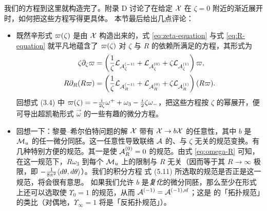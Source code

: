 我们的方程到这里就构造完了。附录 D 讨论了在给定 $\mathcal{X}$ 在 $\zeta = 0$ 附近的渐近展开时，如何把这些方程写得更具体。%
本节最后给出几点评论：

\begin{itemize}
\item
既然辛形式 $\varpi(\zeta)$ 是由 $\mathcal{X}$ 构造出来的，式 \eqref{eq:zeta-equation} 与式 \eqref{eq:R-equation} 就平凡地蕴含了 $\varpi(\zeta)$ 对 $\zeta$ 与 $R$ 的依赖所满足的方程，其形式为
\begin{align}
\zeta \partial_\zeta \varpi &= \left( \frac{1}{\zeta} \mathcal{L}_{\mathcal{A}_\zeta^{(-1)}} +
\mathcal{L}_{\mathcal{A}_\zeta^{(0)}} + \zeta \mathcal{L}_{\mathcal{A}_\zeta^{(1)}} \right)  \varpi,
\\ R \partial_R (R\varpi) &= \left( \frac{1}{\zeta} \mathcal{L}_{\mathcal{A}_R^{(-1)}} +
\mathcal{L}_{\mathcal{A}_R^{(0)}} + \zeta \mathcal{L}_{\mathcal{A}_R^{(1)}} \right) (R \varpi). \label{eq:omega-R}
\end{align}
回想式 (3.4) 中 $\varpi(\zeta) = - \frac{i}{2 \zeta}\omega^+ + \omega_3 - \frac{i}{2} \zeta \omega_-$，把这些方程按 $\zeta$ 的幂展开，便可导出超凯勒形式 $\vec\omega$ 的一些有趣的微分方程。%

\item
回想一下：黎曼--希尔伯特问题的解 $\mathcal{X}$ 带有 $\mathcal{X} \to b \mathcal{X}$ 的任意性，其中 $b$ 是 $\mathcal{M}_u$ 的任一微分同胚。这一任意性导致联络 $\mathcal{A}$ 的、与 $\zeta$ 无关的规范变换。有几种特别方便的规范。其一是使 $\mathcal{A}_R^{(0)} = 0$ 的规范。由式 \eqref{eq:omega-R} 可知，在这一规范下，$R \omega_3$ 到每个 $\mathcal{M}_u$ 上的限制与 $R$ 无关（因而等于其 $R \to \infty$ 极限，即 $- \frac{1}{8 \pi^2} \langle d\theta, d\theta \rangle$）。我们的积分方程 式 (5.11) 所选取的规范是否正是这一规范，将会很有意思。%
如果我们允许 $b$ 是\emph{复化}的微分同胚，那么至少在形式上还可以选取使 $\Upsilon_0 = 1$ 的规范，从而 $\mathcal{A}^{(-1)} = \mathcal{A}^{(-1),{\mathrm{sf}}}$；这是 \cite{Cecotti:1993rm} 的「拓扑规范」的类比（对偶地，$\Upsilon_\infty = 1$ 将是「反拓扑规范」）。


\end{itemize}
